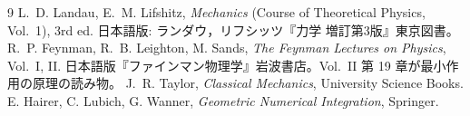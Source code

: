 \begin{thebibliography}{9}
  L.~D. Landau, E.~M. Lifshitz,
  \textit{Mechanics} (Course of Theoretical Physics, Vol.~1), 3rd ed.
  日本語版: ランダウ，リフシッツ『力学 増訂第3版』東京図書。
  R.~P. Feynman, R.~B. Leighton, M. Sands,
  \textit{The Feynman Lectures on Physics}, Vol.~I, II.
  日本語版『ファインマン物理学』岩波書店。Vol.~II 第 19 章が最小作用の原理の読み物。
  J.~R. Taylor, \textit{Classical Mechanics}, University Science Books.
  E. Hairer, C. Lubich, G. Wanner,
  \textit{Geometric Numerical Integration}, Springer.
\end{thebibliography}
